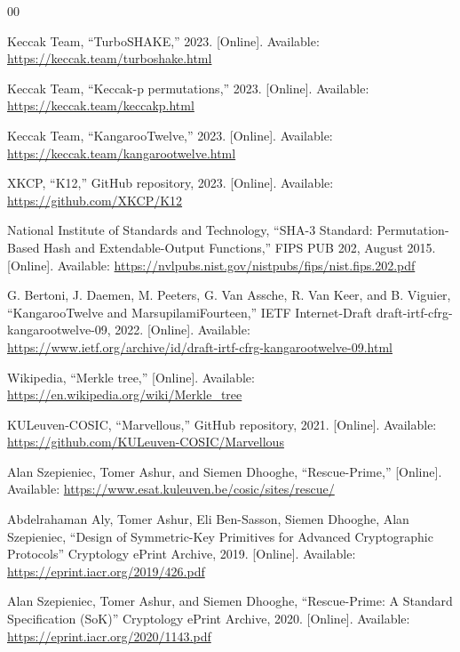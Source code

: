 \documentclass[conference]{IEEEtran}
\begin{document}
\begin{thebibliography}{00}

Keccak Team, ``TurboSHAKE,'' 2023. [Online]. Available: \url{https://keccak.team/turboshake.html}

Keccak Team, ``Keccak-p permutations,'' 2023. [Online]. Available: \url{https://keccak.team/keccakp.html}

Keccak Team, ``KangarooTwelve,'' 2023. [Online]. Available: \url{https://keccak.team/kangarootwelve.html}

XKCP, ``K12,'' GitHub repository, 2023. [Online]. Available: \url{https://github.com/XKCP/K12}

National Institute of Standards and Technology, ``SHA-3 Standard: Permutation-Based Hash and Extendable-Output Functions,'' FIPS PUB 202, August 2015. [Online]. Available: \url{https://nvlpubs.nist.gov/nistpubs/fips/nist.fips.202.pdf}

G. Bertoni, J. Daemen, M. Peeters, G. Van Assche, R. Van Keer, and B. Viguier, ``KangarooTwelve and MarsupilamiFourteen,'' IETF Internet-Draft draft-irtf-cfrg-kangarootwelve-09, 2022. [Online]. Available: \url{https://www.ietf.org/archive/id/draft-irtf-cfrg-kangarootwelve-09.html}

Wikipedia, ``Merkle tree,'' [Online]. Available: \url{https://en.wikipedia.org/wiki/Merkle_tree}

KULeuven-COSIC, ``Marvellous,'' GitHub repository, 2021. [Online]. Available: \url{https://github.com/KULeuven-COSIC/Marvellous}

Alan Szepieniec, Tomer Ashur, and Siemen Dhooghe, ``Rescue-Prime,'' [Online]. Available: \url{https://www.esat.kuleuven.be/cosic/sites/rescue/ }

Abdelrahaman Aly, Tomer Ashur, Eli Ben-Sasson, Siemen Dhooghe, Alan Szepieniec, ``Design of Symmetric-Key Primitives for Advanced Cryptographic Protocols'' Cryptology ePrint Archive, 2019. [Online]. Available: \url{https://eprint.iacr.org/2019/426.pdf}

Alan Szepieniec, Tomer Ashur, and Siemen Dhooghe, ``Rescue-Prime: A Standard Specification (SoK)'' Cryptology ePrint Archive, 2020. [Online]. Available: \url{https://eprint.iacr.org/2020/1143.pdf}

\end{thebibliography}
\vspace{12pt}
\end{document}
